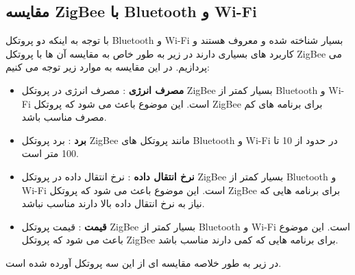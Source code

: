 

\subsection{مقایسه ZigBee با Bluetooth و Wi-Fi}
با توجه به اینکه دو پروتکل 
Bluetooth و Wi-Fi
بسیار شناخته شده و معروف هستند و کاربرد های بسیاری دارند در زیر به طور خاص به مقایسه آن ها با پروتکل 
ZigBee
می پردازیم. در این مقایسه به موارد زیر توجه می کنیم:
\begin{itemize}
    \item 
    {
        \textbf{مصرف انرژی} :
        مصرف انرژی در پروتکل 
        ZigBee
        بسیار کمتر از 
        Bluetooth
        و 
        Wi-Fi
        است. این موضوع باعث می شود که پروتکل 
        ZigBee
        برای برنامه های کم مصرف مناسب باشد.
    }
    \item 
    {
        \textbf{برد} :
        برد پروتکل 
        ZigBee
        مانند پروتکل های 
        Bluetooth
        و
        Wi-Fi
        در حدود
        از 10 تا 100 متر است.
    }
    \item 
    {
        \textbf{نرخ انتقال داده} :
        نرخ انتقال داده در پروتکل 
        ZigBee
        بسیار کمتر از 
        Bluetooth
        و 
        Wi-Fi
        است. این موضوع باعث می شود که پروتکل 
        ZigBee
        برای برنامه هایی که نیاز به نرخ انتقال داده بالا دارند مناسب نباشد.
    }
    \item 
    {
        \textbf{قیمت} :
        قیمت پروتکل 
        ZigBee
        بسیار کمتر از 
        Bluetooth
        و 
        Wi-Fi
        است. این موضوع باعث می شود که پروتکل 
        ZigBee
        برای برنامه هایی که
        کمی دارند مناسب باشد.
    }
\end{itemize}
در زیر به طور خلاصه مقایسه ای از این سه پروتکل آورده شده است.

